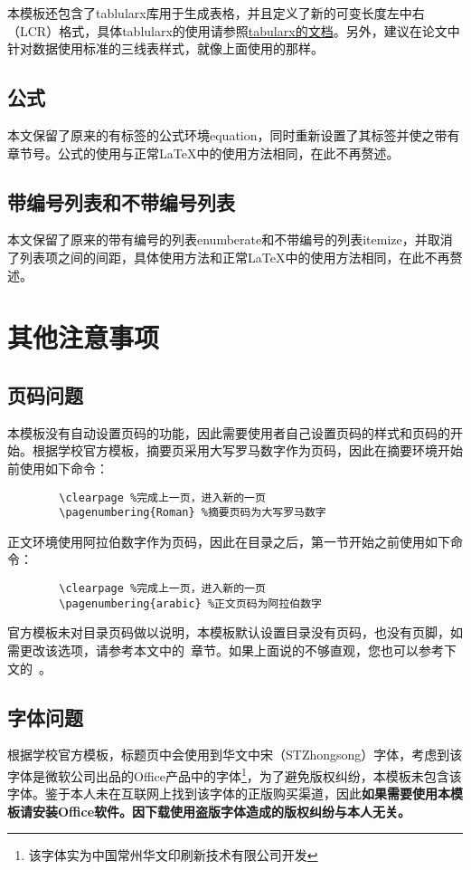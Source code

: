 \documentclass[UTF8]{ctexart}
\begin{document}
	本模板还包含了tablularx库用于生成表格，并且定义了新的可变长度左中右（LCR）格式，具体tablularx的使用请参照\href{http://mirror.lzu.edu.cn/CTAN/macros/latex/required/tools/tabularx.pdf}{tabularx的文档}。另外，建议在论文中针对数据使用标准的三线表样式，就像上面使用的那样。
	
	\subsection{公式}
	本文保留了原来的有标签的公式环境equation，同时重新设置了其标签并使之带有章节号。公式的使用与正常\LaTeX 中的使用方法相同，在此不再赘述。
	
	\subsection{带编号列表和不带编号列表}
	本文保留了原来的带有编号的列表enumberate和不带编号的列表itemize，并取消了列表项之间的间距，具体使用方法和正常\LaTeX 中的使用方法相同，在此不再赘述。
	
	\section{其他注意事项}
	\subsection{页码问题}\label{subsec:pagenum}
	本模板没有自动设置页码的功能，因此需要使用者自己设置页码的样式和页码的开始。根据学校官方模板，摘要页采用大写罗马数字作为页码，因此在摘要环境开始前使用如下命令：
	\begin{verbatim}
		\clearpage %完成上一页，进入新的一页
		\pagenumbering{Roman} %摘要页码为大写罗马数字
	\end{verbatim}
	正文环境使用阿拉伯数字作为页码，因此在目录之后，第一节开始之前使用如下命令：
	\begin{verbatim}
		\clearpage %完成上一页，进入新的一页
		\pagenumbering{arabic} %正文页码为阿拉伯数字
	\end{verbatim}
	官方模板未对目录页码做以说明，本模板默认设置目录没有页码，也没有页脚，如需更改该选项，请参考本文中的~章节。如果上面说的不够直观，您也可以参考下文的~。
	
	\subsection{字体问题}
	根据学校官方模板，标题页中会使用到华文中宋（STZhongsong）字体，考虑到该字体是微软\textsuperscript{\textregistered}公司出品的Office产品中的字体\footnote{该字体实为中国常州华文印刷新技术有限公司\textsuperscript{\texttrademark}开发}，为了避免版权纠纷，本模板未包含该字体。鉴于本人未在互联网上找到该字体的正版购买渠道，因此{\bfseries 如果需要使用本模板请安装Office软件。因下载使用盗版字体造成的版权纠纷与本人无关。}
	
\end{document}

